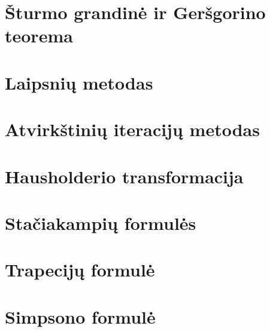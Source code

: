 \section{Šturmo grandinė ir Geršgorino teorema}
\cite[144]{textbook}
\section{Laipsnių metodas}
\cite[151-154]{textbook}
\section{Atvirkštinių iteracijų metodas}
\cite[141-142,146-148]{textbook}
\section{Hausholderio transformacija}
\cite[148-151]{textbook}

\section{Stačiakampių formulės}
\cite[181-184]{textbook}
\section{Trapecijų formulė}
\cite[184-186]{textbook}
\section{Simpsono formulė}
\cite[187-188]{textbook}
